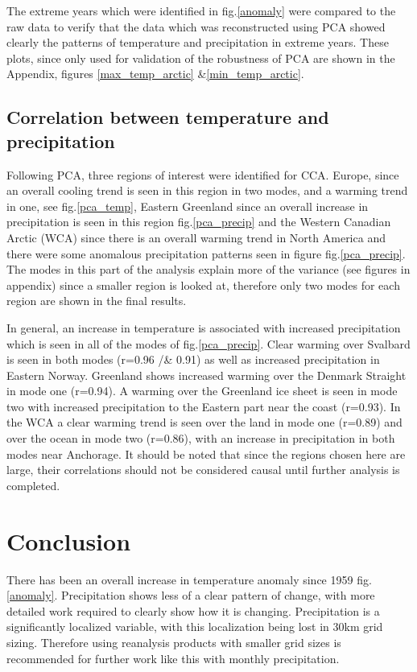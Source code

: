 \documentclass[11pt, oneside]{article}
\begin{document}
        The extreme years which were identified in fig.\ref{anomaly} were compared to the raw data to verify that the data which was reconstructed using PCA showed clearly the patterns of temperature and precipitation in extreme years. These plots, since only used for validation of the robustness of PCA are shown in the Appendix, figures \ref{max_temp_arctic} \&\ref{min_temp_arctic}.


\subsection{Correlation between temperature and precipitation}
Following PCA, three regions of interest were identified for CCA. Europe, since an overall cooling trend is seen in this region in two modes, and a warming trend in one, see fig.\ref{pca_temp}, Eastern Greenland since an overall increase in precipitation is seen in this region fig.\ref{pca_precip} and the Western Canadian Arctic (WCA) since there is an overall warming trend in North America and there were some anomalous precipitation patterns seen in figure fig.\ref{pca_precip}. The modes in this part of the analysis explain more of the variance (see figures in appendix) since a smaller region is looked at, therefore only two modes for each region are shown in the final results.
 
In general, an increase in temperature is associated with increased precipitation \cite{box2019key} which is seen in all of the modes of fig.\ref{pca_precip}. Clear warming over Svalbard is seen in both modes (r=0.96 /& 0.91) as well as increased precipitation in Eastern Norway. Greenland shows increased warming over the Denmark Straight in mode one (r=0.94). A warming over the Greenland ice sheet is seen in mode two with increased precipitation to the Eastern part near the coast (r=0.93). In the WCA a clear warming trend is seen over the land in mode one (r=0.89) and over the ocean in mode two (r=0.86), with an increase in precipitation in both modes near Anchorage. It should be noted that since the regions chosen here are large, their correlations should not be considered causal until further analysis is completed.
 
 



\section{Conclusion}
There has been an overall increase in temperature anomaly since 1959 fig.\ref{anomaly}. Precipitation shows less of a clear pattern of change, with more detailed work required to clearly show how it is changing. Precipitation is a significantly localized variable, with this localization being lost in 30km grid sizing. Therefore using reanalysis products with smaller grid sizes is recommended for further work like this with monthly precipitation.
 
\end{document}
